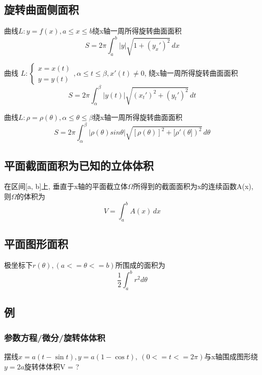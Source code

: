 \subsection{旋转曲面侧面积}

曲线\(L : y = f(x), a \leq x \leq b\)绕x轴一周所得旋转曲面面积
\begin{displaymath}
S = 2\pi \int_{a}^{b}|y|\sqrt{1 + (y_x')^2} \,dx
\end{displaymath}

曲线
\(
L : 
\begin{cases}
x = x(t) \\
y = y(t)
\end{cases},
\alpha \leq t \leq \beta, x'(t) \neq 0
\),
绕x轴一周所得旋转曲面面积
\begin{displaymath}
S = 2\pi \int_{\alpha}^{\beta}|y(t)|\sqrt{(x_t')^2 + (y_t')^2} \,dt
\end{displaymath}

曲线\(L : \rho = \rho(\theta), \alpha \leq \theta \leq \beta\)绕x轴一周所得旋转曲面面积
\begin{displaymath}
S = 2\pi \int_{\alpha}^{\beta}|\rho(\theta)sin\theta|
\sqrt{[\rho(\theta)]^2 + [\rho'(\theta])^2} \,d\theta
\end{displaymath}


\subsection{平面截面面积为已知的立体体积}

在区间[a, b]上, 垂直于x轴的平面截立体\(\Omega\)所得到的截面面积为x的连续函数A(x), 则\(\Omega\)的体积为
\begin{displaymath}
V = \int_{a}^{b} A(x) \,dx
\end{displaymath}


\subsection{平面图形面积}

极坐标下\(r(\theta), (a <= \theta <= b)\)所围成的面积为\[\dfrac{1}{2}\int_a^br^2d\theta\]


\subsection{例}

\subsubsection{参数方程/微分/旋转体体积}
摆线\(x = a(t - \sin t), y = a(1 - \cos t),\ (0 <= t <= 2\pi)\)与x轴围成图形绕\(y = 2a\)旋转体体积V = ?


